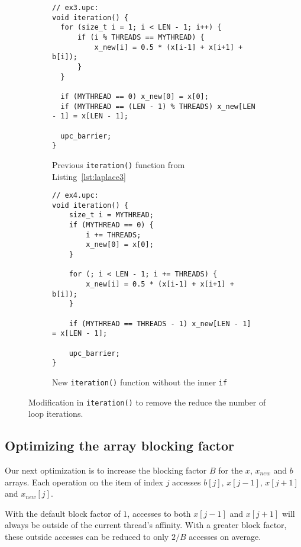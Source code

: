 \documentclass[12pt]{article}
\begin{document}
\begin{figure}[ht]
  \begin{subfigure}[b]{0.49\columnwidth}
    \begin{lstlisting}[style=C, numbers=none]
// ex3.upc:
void iteration() {
  for (size_t i = 1; i < LEN - 1; i++) {
      if (i % THREADS == MYTHREAD) {
          x_new[i] = 0.5 * (x[i-1] + x[i+1] + b[i]);
      }
  }

  if (MYTHREAD == 0) x_new[0] = x[0];
  if (MYTHREAD == (LEN - 1) % THREADS) x_new[LEN - 1] = x[LEN - 1];

  upc_barrier;
}
    \end{lstlisting}
    \caption{Previous \texttt{iteration()} function from Listing~\ref{lst:laplace3}}
  \end{subfigure}
  \hfill
  \begin{subfigure}[b]{0.49\columnwidth}
    \begin{lstlisting}[style=C, numbers=none]
// ex4.upc:
void iteration() {
    size_t i = MYTHREAD;
    if (MYTHREAD == 0) {
        i += THREADS;
        x_new[0] = x[0];
    }

    for (; i < LEN - 1; i += THREADS) {
        x_new[i] = 0.5 * (x[i-1] + x[i+1] + b[i]);
    }

    if (MYTHREAD == THREADS - 1) x_new[LEN - 1] = x[LEN - 1];

    upc_barrier;
}
    \end{lstlisting}
    \caption{New \texttt{iteration()} function without the inner \texttt{if}}
  \end{subfigure}
  \caption{Modification in \texttt{iteration()} to remove the reduce the number of loop iterations.}
  \label{fig:laplace34}
\end{figure}

% 

\subsection{Optimizing the array blocking factor}

Our next optimization is to increase the blocking factor $B$ for the $x$, $x_{new}$ and $b$ arrays.
Each operation on the item of index $j$ accesses $b[j]$, $x[j-1]$, $x[j+1]$ and $x_{new}[j]$.

With the default block factor of $1$, accesses to both $x[j-1]$ and $x[j+1]$ will always be outside of the current thread's affinity.
With a greater block factor, these outside accesses can be reduced to only $2/B$ accesses on average.
\end{document}
